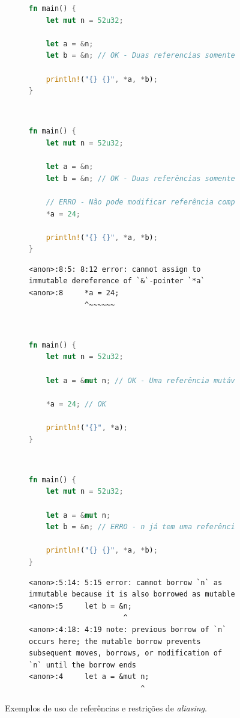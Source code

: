 \documentclass[tg]{mdtufsm}
\begin{document}
\begin{figure}
	\centering
	\begin{subfigure}[c]{0.48\textwidth}
	\begin{lstlisting}[language=Rust]
fn main() {
	let mut n = 52u32;

	let a = &n;
	let b = &n; // OK - Duas referencias somente-leitura

	println!("{} {}", *a, *b);
}
	\end{lstlisting}
	\caption{}
	\label{code:aliasing:shared1}
	\end{subfigure}
	~~~
	\begin{subfigure}[c]{0.48\textwidth}
	\begin{lstlisting}[language=Rust]
fn main() {
	let mut n = 52u32;

	let a = &n;
	let b = &n; // OK - Duas referências somente-leitura

	// ERRO - Não pode modificar referência compartilhada
	*a = 24;

	println!("{} {}", *a, *b);
}
	\end{lstlisting}
	\begin{lstlisting}[numbers=none, breaklines=true]
<anon>:8:5: 8:12 error: cannot assign to immutable dereference of `&`-pointer `*a`
<anon>:8     *a = 24;
             ^~~~~~~
	\end{lstlisting}
	\caption{}
	\label{code:aliasing:shared2}
	\end{subfigure}
	\\[2em]
	\begin{subfigure}[c]{0.48\textwidth}
	\begin{lstlisting}[language=Rust]
fn main() {
	let mut n = 52u32;

	let a = &mut n; // OK - Uma referência mutável

	*a = 24; // OK

	println!("{}", *a);
}
	\end{lstlisting}
	\caption{}
	\label{code:aliasing:mut1}
	\end{subfigure}
	~~~
	\begin{subfigure}[c]{0.48\textwidth}
	\begin{lstlisting}[language=Rust]
fn main() {
	let mut n = 52u32;

	let a = &mut n;
	let b = &n; // ERRO - n já tem uma referência mutável

	println!("{} {}", *a, *b);
}
	\end{lstlisting}
	\begin{lstlisting}[numbers=none, breaklines=true]
<anon>:5:14: 5:15 error: cannot borrow `n` as immutable because it is also borrowed as mutable
<anon>:5     let b = &n;
                      ^
<anon>:4:18: 4:19 note: previous borrow of `n` occurs here; the mutable borrow prevents subsequent moves, borrows, or modification of `n` until the borrow ends
<anon>:4     let a = &mut n;
                          ^
	\end{lstlisting}
	\caption{}
	\label{code:aliasing:mut2}
	\end{subfigure}
	\caption{Exemplos de uso de referências e restrições de \emph{aliasing}.}
	\label{code:aliasing}
\end{figure}
\end{document}
